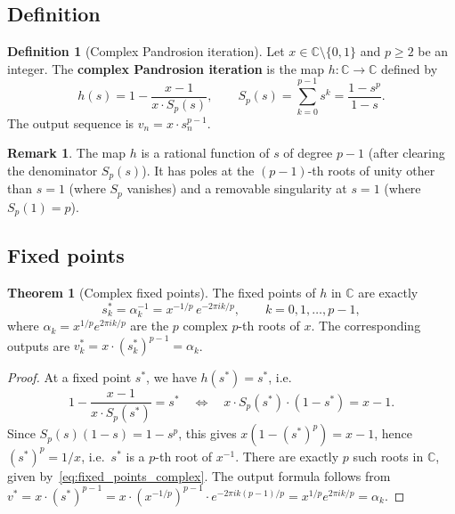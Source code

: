 \documentclass[11pt,a4paper]{article}
\theoremstyle{definition}
\newtheorem{definition}{Definition}[section]
\newtheorem{theorem}{Theorem}[section]
\newtheorem{remark}{Remark}[section]
\newcommand{\CC}{\mathbb{C}}
\begin{document}
\subsection{Definition}

\begin{definition}[Complex Pandrosion iteration]
\label{def:complex_pandrosion}
Let $x \in \CC \setminus \{0,1\}$ and $p \geq 2$ be an integer.  The \textbf{complex Pandrosion iteration} is the map $h : \CC \to \CC$ defined by
\begin{equation}
  \label{eq:complex_pandrosion}
  h(s) = 1 - \frac{x-1}{x \cdot S_p(s)},
  \qquad
  S_p(s) = \sum_{k=0}^{p-1} s^k = \frac{1 - s^p}{1 - s}.
\end{equation}
The output sequence is $v_n = x \cdot s_n^{p-1}$.
\end{definition}

\begin{remark}
The map $h$ is a rational function of $s$ of degree $p-1$ (after clearing the denominator $S_p(s)$).  It has poles at the $(p-1)$-th roots of unity other than $s = 1$ (where $S_p$ vanishes) and a removable singularity at $s = 1$ (where $S_p(1) = p$).
\end{remark}

\subsection{Fixed points}

\begin{theorem}[Complex fixed points]
\label{thm:complex_fixed_points}
The fixed points of $h$ in $\CC$ are exactly
\begin{equation}
  \label{eq:fixed_points_complex}
  s_k^* = \alpha_k^{-1} = x^{-1/p}\, e^{-2\pi i k/p},
  \qquad k = 0, 1, \ldots, p-1,
\end{equation}
where $\alpha_k = x^{1/p} e^{2\pi ik/p}$ are the $p$ complex $p$-th roots of $x$.  The corresponding outputs are $v_k^* = x \cdot (s_k^*)^{p-1} = \alpha_k$.
\end{theorem}

\begin{proof}
At a fixed point $s^*$, we have $h(s^*) = s^*$, i.e.\
\[
  1 - \frac{x-1}{x \cdot S_p(s^*)} = s^*
  \quad \Longleftrightarrow \quad
  x \cdot S_p(s^*) \cdot (1 - s^*) = x - 1.
\]
Since $S_p(s)(1-s) = 1 - s^p$, this gives $x(1 - (s^*)^p) = x - 1$, hence $(s^*)^p = 1/x$, i.e.\ $s^*$ is a $p$-th root of $x^{-1}$.  There are exactly $p$ such roots in $\CC$, given by~\eqref{eq:fixed_points_complex}.  The output formula follows from $v^* = x \cdot (s^*)^{p-1} = x \cdot (x^{-1/p})^{p-1} \cdot e^{-2\pi ik(p-1)/p} = x^{1/p} e^{2\pi ik/p} = \alpha_k$.
\end{proof}
\end{document}
